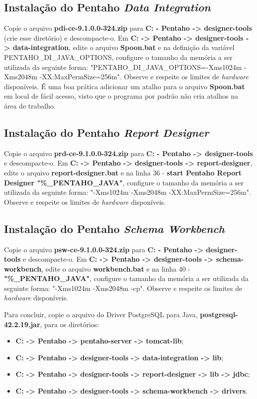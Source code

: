 \begin{apendicesenv}
\subsection{Instalação do Pentaho \textit{Data Integration}}
Copie o arquivo \textbf{pdi-ce-9.1.0.0-324.zip} para \textbf{C: - Pentaho -> designer-tools} (crie esse diretório) e descompacte-o. Em \textbf{C: -> Pentaho -> designer-tools -> data-integration}, edite o arquivo \textbf{Spoon.bat} e na definição da variável PENTAHO\_DI\_JAVA\_OPTIONS, configure o tamanho da memória a ser utilizada da seguinte forma: "PENTAHO\_DI\_JAVA\_OPTIONS=-Xms1024m -Xms2048m -XX:MaxPermSize=256m". Observe e respeite os limites de \textit{hardware} disponíveis. É uma boa prática adicionar um atalho para o arquivo \textbf{Spoon.bat} em local de fácil acesso, visto que o programa por padrão não cria atalhos na área de trabalho.

\subsection{Instalação do Pentaho \textit{Report Designer}}
Copie o arquivo \textbf{prd-ce-9.1.0.0-324.zip} para \textbf{C: - Pentaho -> designer-tools} e descompacte-o. Em \textbf{C: -> Pentaho -> designer-tools -> report-designer}, edite o arquivo \textbf{report-designer.bat} e na linha 36 - \textbf{start Pentaho Report Designer "\%\_PENTAHO\_JAVA"}, configure o tamanho da memória a ser utilizada da seguinte forma: "-Xms1024m -Xms2048m -XX:MaxPermSize=256m". Observe e respeite os limites de \textit{hardware} disponíveis.

\subsection{Instalação do Pentaho \textit{Schema Workbench}}
Copie o arquivo \textbf{psw-ce-9.1.0.0-324.zip} para \textbf{C: - Pentaho -> designer-tools} e descompacte-o. Em \textbf{C: -> Pentaho -> designer-tools -> schema-workbench}, edite o arquivo \textbf{workbench.bat} e na linha 40 - \textbf{"\%\_PENTAHO\_JAVA"}, configure o tamanho da memória a ser utilizada da seguinte forma: "-Xms1024m -Xms2048m -cp". Observe e respeite os limites de \textit{hardware} disponíveis.

Para concluir, copie o arquivo do Driver PostgreSQL para Java, \textbf{postgresql-42.2.19.jar}, para os diretórios:
\begin{itemize}
   \item \textbf{C: -> Pentaho -> pentaho-server -> tomcat-lib};
   \item \textbf{C: -> Pentaho -> designer-tools -> data-integration -> lib};
   \item \textbf{C: -> Pentaho -> designer-tools -> report-designer -> lib -> jdbc}; 
   \item \textbf{C: -> Pentaho -> designer-tools -> schema-workbench -> drivers}.
\end{itemize}


\end{apendicesenv}
